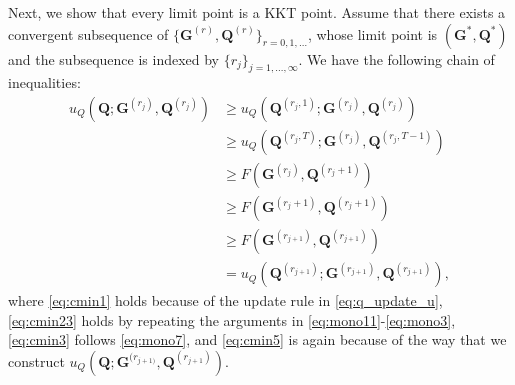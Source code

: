 \documentclass[10pt,journal]{IEEEtran}
\begin{document}
Next, we show that every limit point is a KKT point.
Assume that there exists a convergent subsequence of $\{{\bm G}^{(r)},{\bm Q}^{(r)}\}_{r=0,1,\ldots}$,
whose limit point is $({\bm G}^\ast,{\bm Q}^\ast)$ and the subsequence is indexed by $\{r_j\}_{j=1,\ldots,\infty}$.
We have the following chain of inequalities:
\begin{subequations}\label{eq:u_Q}
\begin{align}
         u_Q\left({\bm Q};{\bm G}^{(r_j)},{\bm Q}^{(r_j)}\right) &\geq u_Q\left({\bm Q}^{(r_j,1)};{\bm G}^{(r_j)},{\bm Q}^{(r_j)}\right) \label{eq:cmin1}\\
				                               &\geq u_Q\left({\bm Q}^{(r_j,T)};{\bm G}^{(r_j)},{\bm Q}^{(r_j,T-1)}\right) \label{eq:cmin23}\\
				                              &\geq F({\bm G}^{(r_j)},{\bm Q}^{(r_j+1)})\label{eq:cmin24}\\					
                                               &\geq F\left({\bm G}^{(r_j+1)},{\bm Q}^{(r_j+1)}\right)  \label{eq:cmin3}\\
											  &\geq F\left({\bm G}^{(r_{j+1})},{\bm Q}^{(r_{j+1})}\right)  \label{eq:cmin4}\\
											   & = u_Q\left({\bm Q}^{(r_{j+1})};{\bm G}^{(r_{j+1})},{\bm Q}^{(r_{j+1})}\right), \label{eq:cmin5}
\end{align}
\end{subequations}
where \eqref{eq:cmin1} holds because of the update rule in \eqref{eq:q_update_u},
\eqref{eq:cmin23} holds by repeating the arguments in \eqref{eq:mono11}-\eqref{eq:mono3},
\eqref{eq:cmin3} follows \eqref{eq:mono7},
and \eqref{eq:cmin5} is again because of the way that we construct $u_Q({\bm Q};{\bm G}^{(r_{j+1)}},{\bm Q}^{(r_{j+1})})$.

\end{document}
